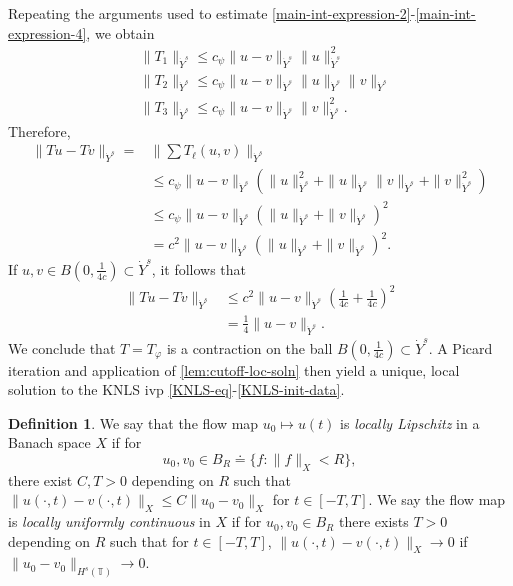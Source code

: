 \documentclass[12pt,reqno]{amsart}
\numberwithin{equation}{section}  %
\numberwithin{figure}{section}
\newcommand{\ci}{\mathbb{T}}
\newcommand{\vp}{\varphi}
\theoremstyle{plain}
\theoremstyle{definition}
\newtheorem{definition}{Definition}
\theoremstyle{remark}
\begin{document}
Repeating the arguments used to estimate 
\eqref{main-int-expression-2}-\eqref{main-int-expression-4}, we obtain
%
\begin{equation*}
	\begin{split}
		& \|T_1\|_{\dot{Y}^s} \le c_\psi \|u -v \|_{\dot{Y}^s} \|u\|^2_{\dot{Y}^s}
		\\
		& \|T_2\|_{\dot{Y}^s} \le c_\psi \|u -v \|_{\dot{Y}^s} \|u\|_{\dot{Y}^s} \|v\|_{\dot{Y}^s}
		\\
		& \|T_3\|_{\dot{Y}^s} \le c_\psi \|u -v \|_{\dot{Y}^s} \|v\|_{\dot{Y}^s}^2.
	\end{split}
\end{equation*}
%
Therefore,
%
\begin{equation}
	\label{20a}
	\begin{split}
		\|Tu - Tv \|_{\dot{Y}^s} = & \| \sum T_\ell(u, v) \|_{\dot{Y}^s}
		\\
		& \le c_\psi \|u -v \|_{\dot{Y}^s} \left( \|u\|_{\dot{Y}^s}^2 + 
		\|u\|_{\dot{Y}^s} \|v\|_{\dot{Y}^s} + \|v\|_{\dot{Y}^s}^2 \right)
		\\
		& \le c_\psi \|u -v\|_{\dot{Y}^s} \left( \|u\|_{\dot{Y}^s} + \|v\|_{\dot{Y}^s} \right)^2
		\\
		& = c^2 \|u -v\|_{\dot{Y}^s} \left( \|u\|_{\dot{Y}^s} + \|v\|_{\dot{Y}^s} \right)^2.
	\end{split}
\end{equation}
%
If $u, v \in B(0, \frac{1}{4c}) \subset \dot{Y}^s$, it follows that
%
\begin{equation}
	\label{21a}
	\begin{split}
		\|Tu - Tv \|_{\dot{Y}^s}
		& \le c^2 \|u -v \|_{\dot{Y}^s} \left( \frac{1}{4c} + 
		\frac{1}{4c} \right)^2
		\\
		& = \frac{1}{4} \|u -v \|_{\dot{Y}^s}. 
	\end{split}
\end{equation}
%
We conclude that $T = T_{\vp}$ is a contraction on the ball $B(0, 
\frac{1}{4c}) \subset \dot{Y}^s$. A Picard iteration and application of 
\autoref{lem:cutoff-loc-soln} then yield a unique, local
solution to the KNLS ivp \eqref{KNLS-eq}-\eqref{KNLS-init-data}.
\begin{definition}
	We say that the flow map $u_0 \mapsto u(t)$ is \emph{locally Lipschitz} in a Banach
	space $X$ if for
	$$u_0, v_0 \in B_R \doteq \{f: \|f\|_X < R\},$$ there exist $C, T>0$
	depending on $R$ such that $\|u(\cdot, t) - v(\cdot, t)
	\|_X \le C \|u_{0} - v_0 \|_{X}$ for $t \in [-T, T]$. We
	say the flow map is \emph{locally uniformly
	continuous} in $X$ if for
	$u_0, v_0 \in B_R$ there exists $T >0$ depending on $R$ such that for
	$t \in [-T, T]$, $\|u(\cdot, t) - v(\cdot, t) \|_{X} \to
	0$ if $\|u_0 - v_0 \|_{H^{s}(\ci)} \to 0$. 
\end{definition}
\end{document}
